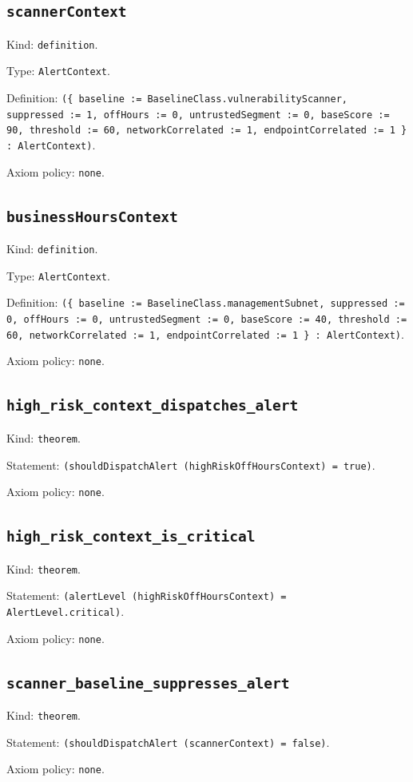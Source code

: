 \documentclass[11pt]{article}
\begin{document}
\subsection*{\texttt{scannerContext}}
\noindent Kind: \texttt{definition}.\par
\noindent Type: \texttt{AlertContext}.\par
\noindent Definition: \texttt{(\{ baseline := BaselineClass.vulnerabilityScanner, suppressed := 1, offHours := 0, untrustedSegment := 0, baseScore := 90, threshold := 60, networkCorrelated := 1, endpointCorrelated := 1 \} : AlertContext)}.\par
\noindent Axiom policy: \texttt{none}.\par
\subsection*{\texttt{businessHoursContext}}
\noindent Kind: \texttt{definition}.\par
\noindent Type: \texttt{AlertContext}.\par
\noindent Definition: \texttt{(\{ baseline := BaselineClass.managementSubnet, suppressed := 0, offHours := 0, untrustedSegment := 0, baseScore := 40, threshold := 60, networkCorrelated := 1, endpointCorrelated := 1 \} : AlertContext)}.\par
\noindent Axiom policy: \texttt{none}.\par
\subsection*{\texttt{high\_risk\_context\_dispatches\_alert}}
\noindent Kind: \texttt{theorem}.\par
\noindent Statement: \texttt{(shouldDispatchAlert (highRiskOffHoursContext) = true)}.\par
\noindent Axiom policy: \texttt{none}.\par
\subsection*{\texttt{high\_risk\_context\_is\_critical}}
\noindent Kind: \texttt{theorem}.\par
\noindent Statement: \texttt{(alertLevel (highRiskOffHoursContext) = AlertLevel.critical)}.\par
\noindent Axiom policy: \texttt{none}.\par
\subsection*{\texttt{scanner\_baseline\_suppresses\_alert}}
\noindent Kind: \texttt{theorem}.\par
\noindent Statement: \texttt{(shouldDispatchAlert (scannerContext) = false)}.\par
\noindent Axiom policy: \texttt{none}.\par
\end{document}
